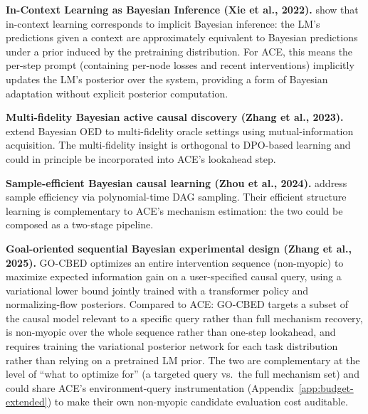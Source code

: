 \textbf{In-Context Learning as Bayesian Inference (Xie et al., 2022).} \citet{xie2022explanation} show that in-context learning corresponds to implicit Bayesian inference: the LM's predictions given a context are approximately equivalent to Bayesian predictions under a prior induced by the pretraining distribution. For ACE, this means the per-step prompt (containing per-node losses and recent interventions) implicitly updates the LM's posterior over the system, providing a form of Bayesian adaptation without explicit posterior computation.

\textbf{Multi-fidelity Bayesian active causal discovery (Zhang et al., 2023).} \citet{zhang2023bayesian} extend Bayesian OED to multi-fidelity oracle settings using mutual-information acquisition. The multi-fidelity insight is orthogonal to DPO-based learning and could in principle be incorporated into ACE's lookahead step.

\textbf{Sample-efficient Bayesian causal learning (Zhou et al., 2024).} \citet{zhou2024sample} address sample efficiency via polynomial-time DAG sampling. Their efficient structure learning is complementary to ACE's mechanism estimation: the two could be composed as a two-stage pipeline.

\textbf{Goal-oriented sequential Bayesian experimental design (Zhang et al., 2025).} GO-CBED \citep{zhang2025gocbed} optimizes an entire intervention sequence (non-myopic) to maximize expected information gain on a user-specified causal query, using a variational lower bound jointly trained with a transformer policy and normalizing-flow posteriors. Compared to ACE: GO-CBED targets a subset of the causal model relevant to a specific query rather than full mechanism recovery, is non-myopic over the whole sequence rather than one-step lookahead, and requires training the variational posterior network for each task distribution rather than relying on a pretrained LM prior. The two are complementary at the level of ``what to optimize for'' (a targeted query vs.\ the full mechanism set) and could share ACE's environment-query instrumentation (Appendix~\ref{app:budget-extended}) to make their own non-myopic candidate evaluation cost auditable.

